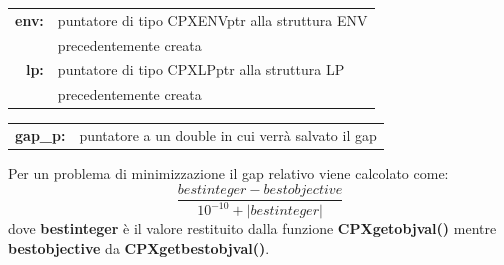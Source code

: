 \begin{itemize}
{\begin{center}
\begin{tabular}{c}
\end{tabular}
\end{center}
\begin{table}[h]
\centering
\begin{tabular}{rl}
\textbf{env:} & {puntatore di tipo CPXENVptr alla struttura ENV}\\
& {precedentemente creata}\\
\textbf{lp:} & {puntatore di tipo CPXLPptr alla struttura LP}\\
& {precedentemente creata}\\
\end{tabular}
\end{table}
\begin{table}[h]
\centering
\begin{tabular}{rl}
\textbf{gap\_p:} & {puntatore a un double in cui verrà salvato il gap}
\end{tabular}
\end{table}
Per un problema di minimizzazione il gap relativo viene calcolato come:
$$\frac{bestinteger - bestobjective}{10^{-10}+|bestinteger|}$$
dove \textbf{bestinteger} è il valore restituito dalla funzione \textbf{CPXgetobjval()} mentre \textbf{bestobjective} da \textbf{CPXgetbestobjval()}.
}
\end{itemize}


